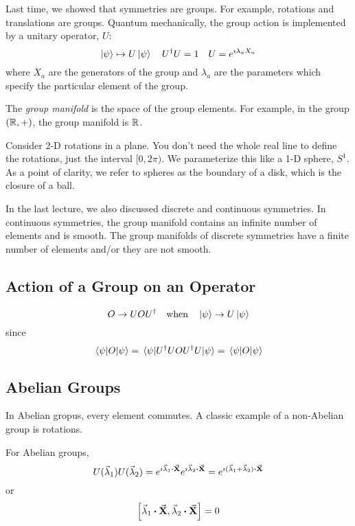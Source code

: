 \documentclass[a4paper,twoside,master.tex]{subfiles}
\begin{document}

Last time, we showed that symmetries are groups. For example, rotations and translations are groups. Quantum mechanically, the group action is implemented by a unitary operator, $ U $:
\begin{equation}
    \ket{\psi} \mapsto U\ket{\psi}\quad U^\dagger U = 1\quad U = e^{\imath \lambda_a X_a}
\end{equation}
where $ X_a $ are the generators of the group and $ \lambda_a $ are the parameters which specify the particular element of the group.

The \textit{group manifold} is the space of the group elements. For example, in the group $ (\mathbb{R}, +) $, the group manifold is $ \mathbb{R} $.

Consider 2-D rotations in a plane. You don't need the whole real line to define the rotations, just the interval $ [0, 2 \pi) $. We parameterize this like a 1-D sphere, $ S^1 $. As a point of clarity, we refer to spheres as the boundary of a disk, which is the closure of a ball.

In the last lecture, we also discussed discrete and continuous symmetries. In continuous symmetries, the group manifold contains an infinite number of elements and is smooth. The group manifolds of discrete symmetries have a finite number of elements and/or they are not smooth.

\subsection{Action of a Group on an Operator}
\label{sub:action_of_a_group_on_an_operator}

\begin{equation}
    O \to UOU^\dagger \qq{when}\ket{\psi} \to U\ket{\psi}
\end{equation}
since
\begin{equation}
    \ev{O}{\psi} = \ev{U^\dagger U O U^\dagger U}{\psi} = \ev{O}{\psi}
\end{equation}

\subsection{Abelian Groups}
\label{sub:abelian_groups}

In Abelian gropus, every element commutes. A classic example of a non-Abelian group is rotations.

For Abelian groups,
\begin{equation}
    U(\va{\lambda}_1) U(\va{\lambda}_2) = e^{\imath \va{\lambda}_1 \vdot \va{ X}} e^{\imath \va{\lambda}_2 \vdot\va{ X}} = e^{\imath (\va{\lambda}_1 + \va{\lambda}_2) \vdot\va{ X}}
\end{equation}
or
\begin{equation}
    \comm{\va{\lambda}_1 \vdot\va{ X}}{\va{\lambda}_2 \vdot\va{ X}} = 0
\end{equation}
\end{document}
